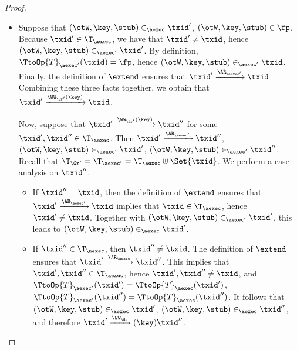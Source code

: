 \begin{proof}
\begin{enumerate}
\begin{itemize}
\item Suppose that $(\otW, \key, \stub) \in_{\aexec} \txid'$, $(\otW, \key, \stub) \in \fp$. Because $\txid' \in \T_{\aexec}$, 
we have that $\txid' \neq \txid$, hence $(\otW, \key, \stub) \in_{\aexec' }\txid'$. By definition, 
$\TtoOp{T}_{\aexec'}(\txid) = \fp$, hence $(\otW, \key, \stub) \in_{\aexec'} \txid$. Finally, 
the definition of $\extend$ ensures that $\txid' \xrightarrow{\AR_{\aexec'}} \txid$. Combining 
these three facts together, we obtain that  
$\txid' \xrightarrow{\WW_{\Gr'}(\key)} \txid$. 

Now, suppose that $\txid' \xrightarrow{\WW_{\Gr'}(\key)} \txid''$ for some $\txid', \txid'' \in \T_{\aexec}$. 
Then $\txid' \xrightarrow{\AR_{\aexec'}} \txid''$, $(\otW, \key, \stub) \in_{\aexec'} \txid'$, $(\otW, \key, \stub) 
\in_{\aexec'} \txid''$. 
Recall that $\T_{\Gr'} = \T_{\aexec'} = \T_{\aexec} \uplus \Set{ \txid }$. We perform a case analysis on $\txid''$. 

\begin{itemize}

\item If $\txid'' = \txid$, then the definition of $\extend$ ensures that $\txid' \xrightarrow{\AR_{\aexec'}} \txid$ 
implies that $\txid \in \T_{\aexec}$, hence $\txid' \neq \txid$. 
Together with $(\otW, \key, \stub) \in_{\aexec'} 
\txid'$, this leads to $(\otW, \key, \stub) \in_{\aexec} \txid'$. 

\item If $\txid'' \in \T_{\aexec}$, then $\txid'' \neq \txid$. The definition of $\extend$ ensures that $\txid' \xrightarrow{\AR_{\aexec}} \txid''$. 
This implies that $\txid', \txid'' \in \T_{\aexec}$, hence $\txid', \txid'' \neq \txid$, and $\TtoOp{T}_{\aexec'}(\txid') = \TtoOp{T}_{\aexec}(\txid')$, 
$\TtoOp{T}_{\aexec'}(\txid'') = \TtoOp{T}_{\aexec}(\txid'')$. It follows that $(\otW, \key, \stub) \in_{\aexec} \txid'$, 
$(\otW, \key, \stub) \in_{\aexec} \txid''$, and therefore $\txid' \xrightarrow{\WW_{\Gr}}(\key) \txid''$.

\end{itemize}
\end{itemize}
\end{enumerate}
\end{proof}


